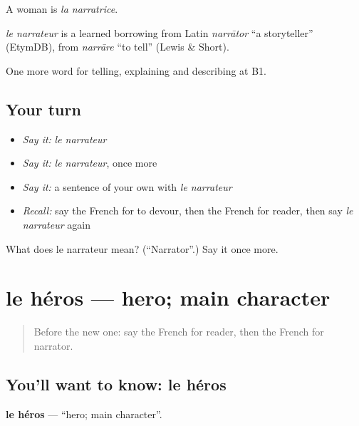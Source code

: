 A woman is \emph{la narratrice}.

\begin{cousinweb}
\emph{le narrateur} is a learned borrowing from Latin \emph{narrātor} \textquotedblleft{}a storyteller\textquotedblright{} (EtymDB), from \emph{narrāre} \textquotedblleft{}to tell\textquotedblright{} (Lewis \& Short).
\end{cousinweb}

\begin{grammarlens}[title={What you've built}]
One more word for telling, explaining and describing at B1.
\end{grammarlens}

\subsection*{Your turn}
\begin{itemize}
\raggedright
  \item \emph{Say it:} \emph{le narrateur}
  \item \emph{Say it:} \emph{le narrateur}, once more
  \item \emph{Say it:} a sentence of your own with \emph{le narrateur}
  \item \emph{Recall:} say the French for to devour, then the French for reader, then say \emph{le narrateur} again
\end{itemize}

\begin{tcolorbox}[breakable,colback=teal!4,colframe=teal!35!black,title={Before you move on}]
What does le narrateur mean? (\textquotedblleft{}Narrator\textquotedblright{}.) Say it once more.
\end{tcolorbox}
\section[le héros]{le héros — hero; main character}

\label{lesson:FR-C521-heros}



\begin{quote}
Before the new one: say the French for reader, then the French for narrator.
\end{quote}

\subsection*{You'll want to know: le héros}
\textbf{le héros} — \textquotedblleft{}hero; main character\textquotedblright{}.

